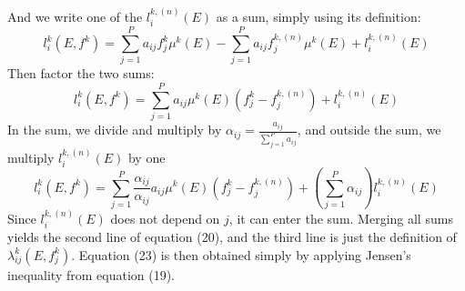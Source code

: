\documentclass[a4paper, 10pt]{article}
\begin{document}
And we write one of the $l_i^{k, (n)}(E)$ as a sum, simply using its definition:
\begin{equation*}
 l_i^k\left( E, f^k\right) = \sum_{j=1}^P a_{ij} f_j^k \mu^k(E) - \sum_{j=1}^P a_{ij} f_j^{k, (n)} \mu^k(E) + l_i^{k, (n)}(E)
\end{equation*}
Then factor the two sums:
\begin{equation*}
 l_i^k\left( E, f^k\right) = \sum_{j=1}^P a_{ij} \mu^k(E) \left( f_j^k - f_j^{k, (n)} \right) + l_i^{k, (n)}(E)
\end{equation*}
In the sum, we divide and multiply by $\alpha_{ij} = \frac{a_{ij}}{\sum_{j=1}^P a_{ij}}$, and outside the sum, we
multiply $l_i^{k, (n)}(E)$ by one
\begin{equation*}
 l_i^k\left( E, f^k\right) = \sum_{j=1}^P \frac{\alpha_{ij}}{\alpha_{ij}} a_{ij} \mu^k(E) \left( f_j^k - f_j^{k, (n)} \right) + \left( \sum_{j=1}^P \alpha_{ij} \right) l_i^{k, (n)}(E)
\end{equation*}
Since $l_i^{k, (n)}(E)$ does not depend on $j$, it can enter the sum. Merging all sums yields the second line of equation (20), and the third line is just the definition of $\lambda_{ij}^k\left( E, f_j^k\right)$.
Equation (23) is then obtained simply by applying Jensen's inequality from equation (19).
\end{document}
